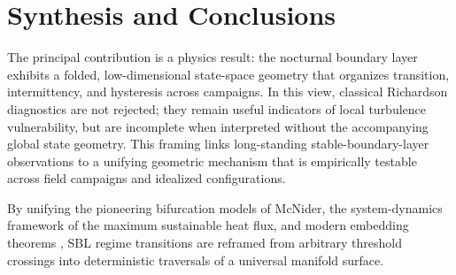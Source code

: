 \documentclass[12pt,a4paper]{article}
\begin{document}
\section{Synthesis and Conclusions}

The principal contribution is a physics result: the nocturnal boundary layer exhibits a folded, low-dimensional state-space geometry that organizes transition, intermittency, and hysteresis across campaigns. In this view, classical Richardson diagnostics are not rejected; they remain useful indicators of local turbulence vulnerability, but are incomplete when interpreted without the accompanying global state geometry. This framing links long-standing stable-boundary-layer observations to a unifying geometric mechanism that is empirically testable across field campaigns and idealized configurations.

By unifying the pioneering bifurcation models of McNider, the system-dynamics framework of the maximum sustainable heat flux, and modern embedding theorems \citep{takens1981}, SBL regime transitions are reframed from arbitrary threshold crossings into deterministic traversals of a universal manifold surface.



\end{document}
